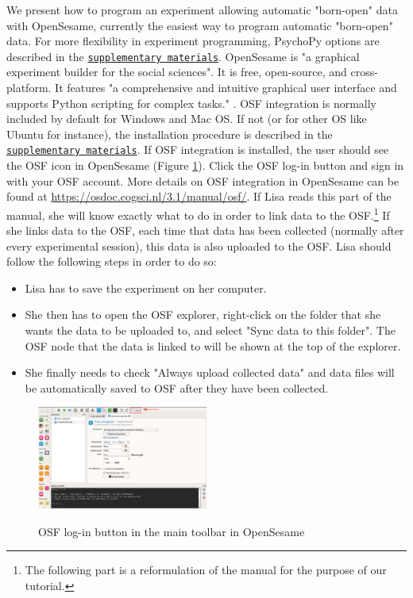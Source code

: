 \documentclass[a4paper,jou,natbib,floatsintext,donotrepeattitle]{apa6}
\begin{document}
We present how to program an experiment allowing automatic "born-open" data with OpenSesame, currently the easiest way to program automatic "born-open" data. For more flexibility in experiment programming, PsychoPy options are described in the \hyperref[sec:supp]{\texttt{supplementary materials}}. OpenSesame is "a graphical experiment builder for the social sciences". It is free, open-source, and cross-platform. It features "a comprehensive and intuitive graphical user interface and supports Python scripting for complex tasks." \citep{mathot_opensesame_2012}. OSF integration is normally included by default for Windows and Mac OS. If not (or for other OS like Ubuntu for instance), the installation procedure is described in the \hyperref[sec:supp]{\texttt{supplementary materials}}. If OSF integration is installed, the user should see the OSF icon in OpenSesame (Figure \ref{fig:osfos}). Click the OSF log-in button and sign in with your OSF account. More details on OSF integration in OpenSesame can be found at \url{https://osdoc.cogsci.nl/3.1/manual/osf/}. If Lisa reads this part of the manual, she will know exactly what to do in order to link data to the OSF.\footnote{The following part is a reformulation of the manual for the purpose of our tutorial.} If she links data to the OSF, each time that data has been collected (normally after every experimental session), this data is also uploaded to the OSF. Lisa should follow the following steps in order to do so:

\begin{itemize}
    \item Lisa has to save the experiment on her computer.
    \item She then has to open the OSF explorer, right-click on the folder that she wants the data to be uploaded to, and select "Sync data to this folder". The OSF node that the data is linked to will be shown at the top of the explorer.
    \item She finally needs to check "Always upload collected data" and data files will be automatically saved to OSF after they have been collected. 
\end{itemize}

\begin{figure}[H]
  \caption{OSF log-in button in the main toolbar in OpenSesame}
  \centering
  \includegraphics[width=0.5\textwidth]{figures/osf_logo_opensesame_red.png}
  \label{fig:osfos}
\end{figure}
\end{document}
